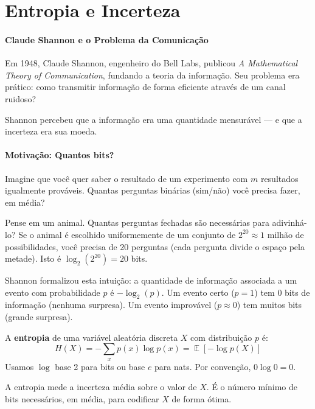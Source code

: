 \documentclass{tufte-handout}
\DeclareMathOperator{\E}{\mathbb{E}}
\begin{document}
\section{Entropia e Incerteza}

\paragraph{Claude Shannon e o Problema da Comunicação}

Em 1948, Claude Shannon, engenheiro do Bell Labs, publicou \textit{A Mathematical Theory
of Communication}, fundando a teoria da informação. Seu problema era prático: como
transmitir informação de forma eficiente através de um canal ruidoso?

Shannon percebeu que a informação era uma quantidade mensurável --- e que a incerteza
era sua moeda.

\paragraph{Motivação: Quantos bits?}

Imagine que você quer saber o resultado de um experimento com $m$ resultados igualmente
prováveis. Quantas perguntas binárias (sim/não) você precisa fazer, em média?

\begin{exmp}
    Pense em um animal. Quantas perguntas fechadas são necessárias para adivinhá-lo?
    Se o animal é escolhido uniformemente de um conjunto de $2^{20} \approx 1$ milhão
    de possibilidades, você precisa de 20 perguntas (cada pergunta divide o espaço pela
    metade). Isto é $\log_2(2^{20}) = 20$ bits.

    Shannon formalizou esta intuição: a quantidade de informação associada a um evento
    com probabilidade $p$ é $-\log_2(p)$. Um evento certo ($p=1$) tem 0 bits de
    informação (nenhuma surpresa). Um evento improvável ($p \approx 0$) tem muitos bits
    (grande surpresa).
\end{exmp}

\begin{defn}[Entropia]
    A \textbf{entropia} de uma variável aleatória discreta $X$ com distribuição $p$ é:
    \[
    H(X) = -\sum_{x} p(x) \log p(x) = \E[-\log p(X)]
    \]
    Usamos $\log$ base 2 para bits ou base $e$ para nats. Por convenção, $0\log 0 = 0$.
\end{defn}

A entropia mede a incerteza média sobre o valor de $X$. É o número mínimo de bits
necessários, em média, para codificar $X$ de forma ótima.
\end{document}
